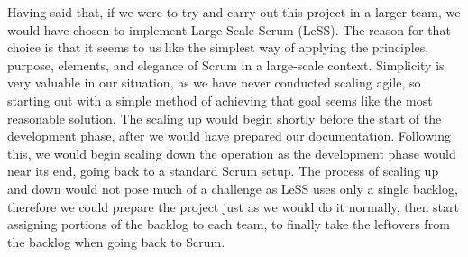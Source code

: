 Having said that, if we were to try and carry out this project in a larger team, we would have chosen to implement Large Scale Scrum (LeSS).
The reason for that choice is that it seems to us like the simplest way of applying the principles, purpose, elements, and elegance
of Scrum in a large-scale context. Simplicity is very valuable in our situation, as we have never conducted scaling agile, so starting out
with a simple method of achieving that goal seems like the most reasonable solution. The scaling up would begin shortly before the start
of the development phase, after we would have prepared our documentation. Following this, we would begin scaling down the operation as the
development phase would near its end, going back to a standard Scrum setup. The process of scaling up and down would not pose much of a challenge
as LeSS uses only a single backlog, therefore we could prepare the project just as we would do it normally, then start assigning
portions of the backlog to each team, to finally take the leftovers from the backlog when going back to Scrum.
